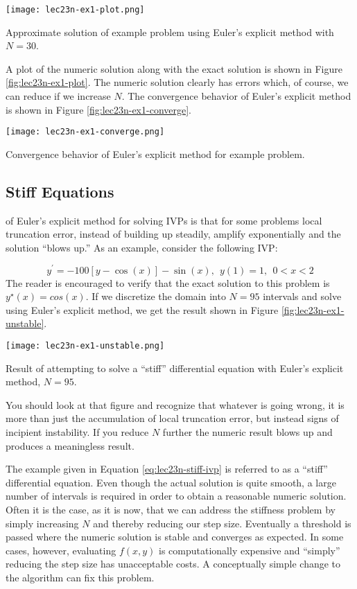 \begin{marginfigure}[-5.0cm]
\texttt{[image: lec23n-ex1-plot.png]}
\caption{Approximate solution of example problem using Euler's explicit method with $N=30$.}
\label{fig:lec23n-ex1-plot}
\end{marginfigure}
A plot of the numeric solution along with the exact solution is shown in Figure \ref{fig:lec23n-ex1-plot}. The numeric solution clearly has errors which, of course, we can reduce if we increase $N$.  The convergence behavior of Euler's explicit method is shown in Figure \ref{fig:lec23n-ex1-converge}.
\begin{marginfigure}[-0.20cm]
\texttt{[image: lec23n-ex1-converge.png]}
\caption{Convergence behavior of Euler's explicit method for example problem.}
\label{fig:lec23n-ex1-converge}
\end{marginfigure}

\subsection{Stiff Equations}

 of Euler's explicit method for solving IVPs is that for some problems local truncation error, instead of building up steadily, amplify exponentially and the solution ``blows up.''  As an example, consider the following IVP:

\begin{equation}
y^{\prime} = -100[y-\cos{(x)}]- \sin{(x)}, \ \ y(1) = 1, \ \ 0<x<2
\label{eq:lec23n-stiff-ivp}
\end{equation}
The reader is encouraged to verify that the exact solution to this problem is $y^{\star}(x)=cos{(x)}$.  If we discretize the domain into $N=95$ intervals and solve using Euler's explicit method, we get the result shown in Figure \ref{fig:lec23n-ex1-unstable}.
\begin{marginfigure}
\texttt{[image: lec23n-ex1-unstable.png]}
\caption{Result of attempting to solve a ``stiff'' differential equation with Euler's explicit method, $N=95$.}
\label{fig:lec23n-ex1-unstable}
\end{marginfigure}
You should look at that figure and recognize that whatever is going wrong, it is more than just the accumulation of local truncation error, but instead signs of incipient instability.  If you reduce $N$ further the numeric result blows up and produces a meaningless result.

The example given in Equation \ref{eq:lec23n-stiff-ivp} is referred to as a ``stiff'' differential equation.  Even though the actual solution is quite smooth, a large number of intervals is required in order to obtain a reasonable numeric solution.  Often it is the case, as it is now, that we can address the stiffness problem by simply increasing $N$ and thereby reducing our step size.  Eventually a threshold is passed where the numeric solution is stable and converges as expected.  In some cases, however, evaluating $f(x,y)$ is computationally expensive and ``simply'' reducing the step size has unacceptable costs.  A conceptually simple change to the algorithm can fix this problem.

